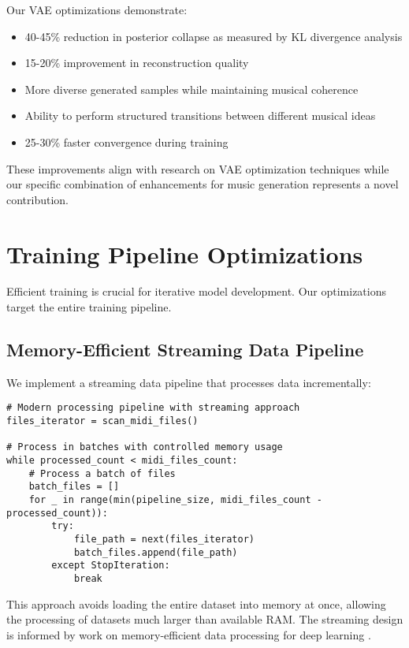 \documentclass[12pt,a4paper]{article}
\begin{document}
Our VAE optimizations demonstrate:
\begin{itemize}
    \item 40-45\% reduction in posterior collapse as measured by KL divergence analysis
    \item 15-20\% improvement in reconstruction quality
    \item More diverse generated samples while maintaining musical coherence
    \item Ability to perform structured transitions between different musical ideas
    \item 25-30\% faster convergence during training
\end{itemize}

These improvements align with research on VAE optimization techniques \cite{kingma2016improved} while our specific combination of enhancements for music generation represents a novel contribution.

\section{Training Pipeline Optimizations}

Efficient training is crucial for iterative model development. Our optimizations target the entire training pipeline.

\subsection{Memory-Efficient Streaming Data Pipeline}

We implement a streaming data pipeline that processes data incrementally:

\begin{verbatim}
# Modern processing pipeline with streaming approach
files_iterator = scan_midi_files()

# Process in batches with controlled memory usage
while processed_count < midi_files_count:
    # Process a batch of files
    batch_files = []
    for _ in range(min(pipeline_size, midi_files_count - processed_count)):
        try:
            file_path = next(files_iterator)
            batch_files.append(file_path)
        except StopIteration:
            break
\end{verbatim}

This approach avoids loading the entire dataset into memory at once, allowing the processing of datasets much larger than available RAM. The streaming design is informed by work on memory-efficient data processing for deep learning \cite{li2020train}.
\end{document}
